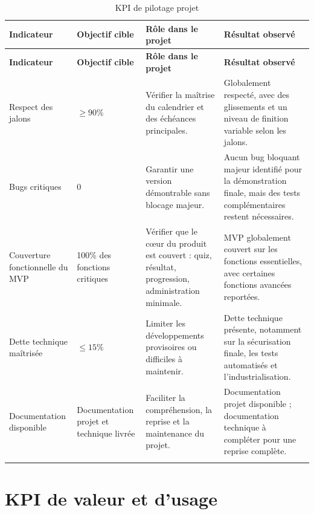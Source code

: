 \begin{longtable}{|p{4cm}|p{3cm}|p{4cm}|p{3cm}|}
\hline
\rowcolor{etnaBlue!15}
\textbf{Indicateur} & \textbf{Objectif cible} & \textbf{Rôle dans le projet} & \textbf{Résultat observé} \\
\hline
\endfirsthead

\hline
\rowcolor{etnaBlue!15}
\textbf{Indicateur} & \textbf{Objectif cible} & \textbf{Rôle dans le projet} & \textbf{Résultat observé} \\
\hline
\endhead

Respect des jalons 
& $\geq 90\%$ 
& Vérifier la maîtrise du calendrier et des échéances principales. 
& Globalement respecté, avec des glissements et un niveau de finition variable selon les jalons. \\
\hline

Bugs critiques 
& 0 
& Garantir une version démontrable sans blocage majeur. 
& Aucun bug bloquant majeur identifié pour la démonstration finale, mais des tests complémentaires restent nécessaires. \\
\hline

Couverture fonctionnelle du MVP 
& 100\% des fonctions critiques 
& Vérifier que le cœur du produit est couvert : quiz, résultat, progression, administration minimale. 
& MVP globalement couvert sur les fonctions essentielles, avec certaines fonctions avancées reportées. \\
\hline

Dette technique maîtrisée 
& $\leq 15\%$ 
& Limiter les développements provisoires ou difficiles à maintenir. 
& Dette technique présente, notamment sur la sécurisation finale, les tests automatisés et l'industrialisation. \\
\hline

Documentation disponible 
& Documentation projet et technique livrée 
& Faciliter la compréhension, la reprise et la maintenance du projet. 
& Documentation projet disponible ; documentation technique à compléter pour une reprise complète. \\
\hline

\caption{KPI de pilotage projet}
\label{tab:kpi-pilotage-projet}
\end{longtable}

\section{KPI de valeur et d'usage}

